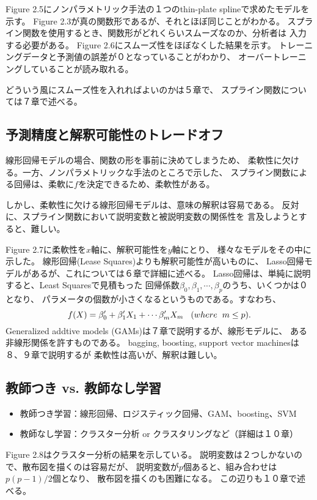 \documentclass{jsbook}
\begin{document}
Figure 2.5にノンパラメトリック手法の１つのthin-plate splineで求めたモデルを示す。
Figure 2.3が真の関数形であるが、それとほぼ同じことがわかる。
スプライン関数を使用するとき、関数形がどれくらいスムーズなのか、分析者は
入力する必要がある。
Figure 2.6にスムーズ性をほぼなくした結果を示す。
トレーニングデータと予測値の誤差が０となっていることがわかり、
オーバートレーニングしていることが読み取れる。

どういう風にスムーズ性を入れればよいのかは５章で、
スプライン関数については７章で述べる。

\subsection{予測精度と解釈可能性のトレードオフ}
線形回帰モデルの場合、関数の形を事前に決めてしまうため、
柔軟性に欠ける。一方、ノンパラメトリックな手法のところで示した、
スプライン関数による回帰は、柔軟に$f$を決定できるため、柔軟性がある。

しかし、柔軟性に欠ける線形回帰モデルは、意味の解釈は容易である。
反対に、スプライン関数において説明変数と被説明変数の関係性を
言及しようとすると、難しい。

Figure 2.7に柔軟性を$x$軸に、解釈可能性を$y$軸にとり、
様々なモデルをその中に示した。
線形回帰(Lease Squares)よりも解釈可能性が高いものに、
Lasso回帰モデルがあるが、これについては６章で詳細に述べる。
Lasso回帰は、単純に説明すると、Least Squaresで見積もった
回帰係数$\beta_0, \beta_1, \cdots, \beta_p$のうち、いくつかは０となり、
パラメータの個数が小さくなるというものである。すなわち、
$$
	f(X) = \beta_0^{\prime} + \beta_1^{\prime} X_1 + \cdots \beta_m^{\prime} X_m \hspace{3mm}(where \hspace{2mm} m \le p).
$$
Generalized addtive models (GAMs)は７章で説明するが、線形モデルに、
ある非線形関係を許すものである。
bagging, boosting, support vector machinesは８、９章で説明するが
柔軟性は高いが、解釈は難しい。

\subsection{教師つき vs. 教師なし学習}
\begin{itemize}
\item 教師つき学習：線形回帰、ロジスティック回帰、GAM、boosting、SVM
\item 教師なし学習：クラスター分析 or クラスタリングなど（詳細は１０章）
\end{itemize}
Figure 2.8はクラスター分析の結果を示している。
説明変数は２つしかないので、散布図を描くのは容易だが、
説明変数が$p$個あると、組み合わせは$p(p-1)/2$個となり、
散布図を描くのも困難になる。
この辺りも１０章で述べる。
\end{document}
